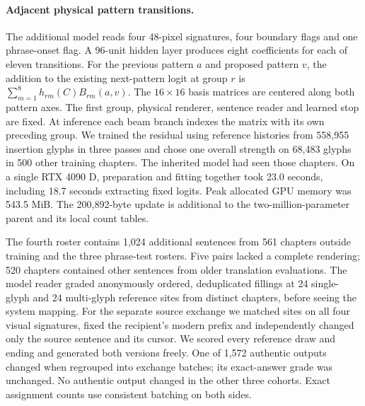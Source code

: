 \paragraph{Adjacent physical pattern transitions.}
The additional model reads four 48-pixel signatures, four boundary flags and one phrase-onset flag. A 96-unit hidden layer produces eight coefficients for each of eleven transitions. For the previous pattern $a$ and proposed pattern $v$, the addition to the existing next-pattern logit at group $r$ is $\sum_{m=1}^{8} h_{rm}(C) B_{rm}(a,v)$. The $16\times16$ basis matrices are centered along both pattern axes. The first group, physical renderer, sentence reader and learned stop are fixed. At inference each beam branch indexes the matrix with its own preceding group. We trained the residual using reference histories from 558,955 insertion glyphs in three passes and chose one overall strength on 68,483 glyphs in 500 other training chapters. The inherited model had seen those chapters. On a single RTX 4090 D, preparation and fitting together took 23.0 seconds, including 18.7 seconds extracting fixed logits. Peak allocated GPU memory was 543.5 MiB. The 200,892-byte update is additional to the two-million-parameter parent and its local count tables.

The fourth roster contains 1,024 additional sentences from 561 chapters outside training and the three phrase-test rosters. Five pairs lacked a complete rendering; 520 chapters contained other sentences from older translation evaluations. The model reader graded anonymously ordered, deduplicated fillings at 24 single-glyph and 24 multi-glyph reference sites from distinct chapters, before seeing the system mapping. For the separate source exchange we matched sites on all four visual signatures, fixed the recipient's modern prefix and independently changed only the source sentence and its cursor. We scored every reference draw and ending and generated both versions freely. One of 1,572 authentic outputs changed when regrouped into exchange batches; its exact-answer grade was unchanged. No authentic output changed in the other three cohorts. Exact assignment counts use consistent batching on both sides.
